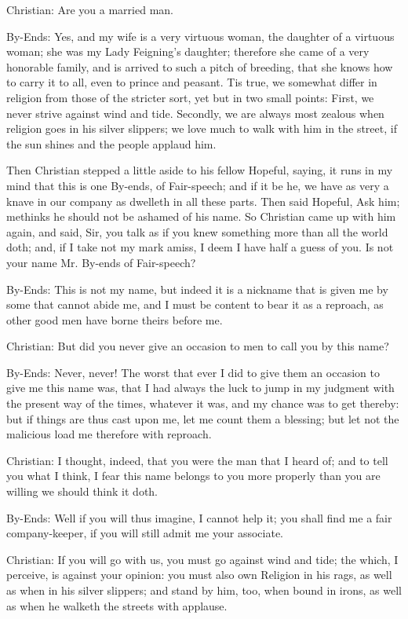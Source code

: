 Christian: Are you a married man.

By-Ends: Yes, and my wife is a very virtuous woman, the daughter of a virtuous woman; she was my Lady Feigning's daughter; therefore she came of a very honorable family, and is arrived to such a pitch of breeding, that she knows how to carry it to all, even to prince and peasant. Tis true, we somewhat differ in religion from those of the stricter sort, yet but in two small points: First, we never strive against wind and tide. Secondly, we are always most zealous when religion goes in his silver slippers; we love much to walk with him in the street, if the sun shines and the people applaud him.

Then Christian stepped a little aside to his fellow Hopeful, saying, it runs in my mind that this is one By-ends, of Fair-speech; and if it be he, we have as very a knave in our company as dwelleth in all these parts. Then said Hopeful, Ask him; methinks he should not be ashamed of his name. So Christian came up with him again, and said, Sir, you talk as if you knew something more than all the world doth; and, if I take not my mark amiss, I deem I have half a guess of you. Is not your name Mr. By-ends of Fair-speech?

By-Ends: This is not my name, but indeed it is a nickname that is given me by some that cannot abide me, and I must be content to bear it as a reproach, as other good men have borne theirs before me.

Christian: But did you never give an occasion to men to call you by this name?

By-Ends: Never, never! The worst that ever I did to give them an occasion to give me this name was, that I had always the luck to jump in my judgment with the present way of the times, whatever it was, and my chance was to get thereby: but if things are thus cast upon me, let me count them a blessing; but let not the malicious load me therefore with reproach.

Christian: I thought, indeed, that you were the man that I heard of; and to tell you what I think, I fear this name belongs to you more properly than you are willing we should think it doth.

By-Ends: Well if you will thus imagine, I cannot help it; you shall find me a fair company-keeper, if you will still admit me your associate.

Christian: If you will go with us, you must go against wind and tide; the which, I perceive, is against your opinion: you must also own Religion in his rags, as well as when in his silver slippers; and stand by him, too, when bound in irons, as well as when he walketh the streets with applause.

